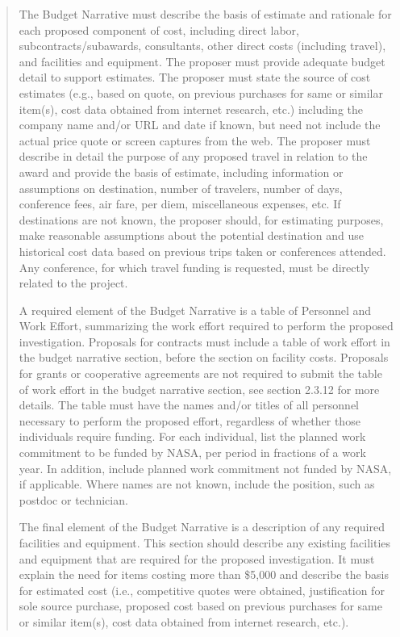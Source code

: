 \documentclass[12pt]{article}
\begin{document}
\begin{quote}
The Budget Narrative must describe the basis of estimate and rationale
for each proposed component of cost, including direct labor,
subcontracts/subawards, consultants, other direct costs (including
travel), and facilities and equipment. The proposer must provide
adequate budget detail to support estimates. The proposer must state
the source of cost estimates (e.g., based on quote, on previous
purchases for same or similar item(s), cost data obtained from
internet research, etc.) including the company name and/or URL and
date if known, but need not include the actual price quote or screen
captures from the web. The proposer must describe in detail the
purpose of any proposed travel in relation to the award and provide
the basis of estimate, including information or assumptions on
destination, number of travelers, number of days, conference fees, air
fare, per diem, miscellaneous expenses, etc. If destinations are not
known, the proposer should, for estimating purposes, make reasonable
assumptions about the potential destination and use historical cost
data based on previous trips taken or conferences attended. Any
conference, for which travel funding is requested, must be directly
related to the project.

A required element of the Budget Narrative is a table of Personnel and
Work Effort, summarizing the work effort required to perform the
proposed investigation. Proposals for contracts must include a table
of work effort in the budget narrative section, before the section on
facility costs. Proposals for grants or cooperative agreements are not
required to submit the table of work effort in the budget narrative
section, see section 2.3.12 for more details. The table must have the
names and/or titles of all personnel necessary to perform the proposed
effort, regardless of whether those individuals require funding. For
each individual, list the planned work commitment to be funded by
NASA, per period in fractions of a work year. In addition, include
planned work commitment not funded by NASA, if applicable. Where names
are not known, include the position, such as postdoc or technician.

The final element of the Budget Narrative is a description of any
required facilities and equipment. This section should describe any
existing facilities and equipment that are required for the proposed
investigation. It must explain the need for items costing more than
\$5,000 and describe the basis for estimated cost (i.e., competitive
quotes were obtained, justification for sole source purchase, proposed
cost based on previous purchases for same or similar item(s), cost
data obtained from internet research, etc.).


\end{quote}
\end{document}
